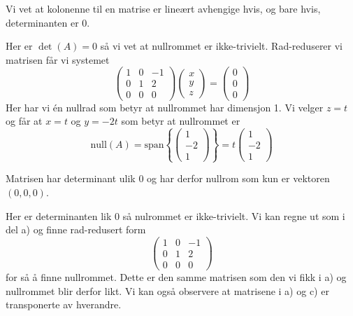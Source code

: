 \begin{losning}
Vi vet at kolonenne til en matrise er lineært avhengige hvis, og bare hvis, determinanten er $0$.
\begin{punkt}
	Her er $\det(A) = 0$ så vi vet at nullrommet er ikke-trivielt. Rad-reduserer vi matrisen får vi systemet
	\begin{equation*}
		\begin{pmatrix}
			1 & 0 & -1 \\
			0 & 1 & 2 \\
			0 & 0 & 0 
		\end{pmatrix}
		\begin{pmatrix}
			x \\ y \\ z
		\end{pmatrix}
		=
		\begin{pmatrix}
			0 \\ 0 \\ 0
		\end{pmatrix}
	\end{equation*}
	Her har vi én nullrad som betyr at nullrommet har dimensjon 1. Vi velger $z=t$ og får at $x=t$ og $y = -2t$ som betyr at nullrommet er
	\begin{equation*}
		\mathrm{null}(A) = \mathrm{span}\left\{\begin{pmatrix}1 \\ -2 \\ 1\end{pmatrix}\right\} = t\begin{pmatrix}1 \\ -2 \\ 1\end{pmatrix}
	\end{equation*}
\end{punkt}
\begin{punkt}
	Matrisen har determinant ulik 0 og har derfor nullrom som kun er vektoren $(0, 0, 0)$.
\end{punkt}
\begin{punkt}
	Her er determinanten lik 0 så nulrommet er ikke-trivielt. Vi kan regne ut som i del a) og finne rad-redusert form
	\begin{equation*}
		\begin{pmatrix}
			1 & 0 & -1 \\
			0 & 1 & 2 \\
			0 & 0 & 0 
		\end{pmatrix}
	\end{equation*}
	for så å finne nullrommet. Dette er den samme matrisen som den vi fikk i a) og nullrommet blir derfor likt. Vi kan også observere at matrisene i a) og c) er transponerte av hverandre.
\end{punkt}
\end{losning}



